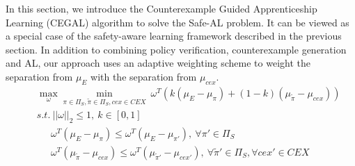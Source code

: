 In this section, we introduce the Counterexample Guided Apprenticeship Learning (CEGAL)
algorithm to solve the Safe-AL problem. 
It can be viewed as a special case of the safety-aware learning framework described in the previous section. 
In addition to combining policy verification, counterexample generation and AL, our approach uses an adaptive weighting scheme to weight the separation from $\mu_E$ with the separation from $\mu_{cex}$.
\begin{eqnarray}
&&\underset{\omega}{\max}\underset{\pi\in\Pi_S,\tilde{\pi}\in\Pi_S, cex\in CEX}{\min}\ \omega^T(k(\mu_E - \mu_{\pi})+(1-k)(\mu_{ \tilde{\pi}}  - \mu_{cex}))\label{eq:sec5_1}\\
&&s.t.\: ||\omega||_2\leq 1 \label{eq:sec5_4},\: k\in[0, 1]\label{eq:sec5_5} \nonumber\\ 
&&\quad\ \:\omega^T(\mu_E - \mu_{\pi})\leq\omega^T(\mu_E - \mu_{\pi'}),\ \forall\pi'\in\Pi_S \label{eq:sec5_2} \nonumber\\ 
&&\quad\ \:\omega^T(\mu_{\tilde{\pi}} - \mu_{cex})\leq\omega^T(\mu_{ \tilde{\pi}'} - \mu_{cex'}),\ \forall \tilde{\pi}'\in\Pi_S, \forall cex'\in{CEX} \nonumber
\end{eqnarray}

